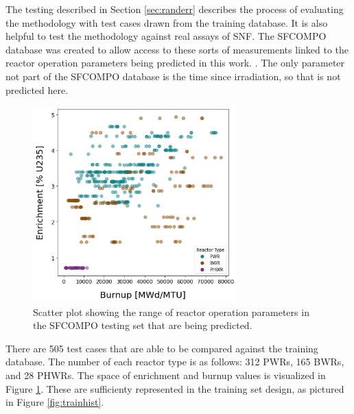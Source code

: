 
The testing described in Section \ref{sec:randerr} describes the process of
evaluating the methodology with test cases drawn from the training database.
It is also helpful to test the methodology against real assays of \gls{SNF}.
The \gls{SFCOMPO} database was created to allow access to these sorts of
measurements linked to the reactor operation parameters being predicted in this
work. \cite{sfcompo}. The only parameter not part of the \gls{SFCOMPO} database
is the time since irradiation, so that is not predicted here. 

\begin{figure}[!htb]
    \centering
    \includegraphics[width=0.7\textwidth]{./chapters/exp1/sfcompo_scatter_viz.png}
    \caption{Scatter plot showing the range of reactor operation parameters in 
             the \gls{SFCOMPO} testing set that are being predicted.}
    \label{fig:sfcoscatter}
\end{figure}

There are 505 test cases that are able to be compared against the training
database.  The number of each reactor type is as follows: 312 \gls{PWR}s, 165
\gls{BWR}s, and 28 \gls{PHWR}s. The space of enrichment and burnup values is
visualized in Figure \ref{fig:sfcoscatter}. These are sufficienty represented
in the training set design, as pictured in Figure \ref{fig:trainhist}.

